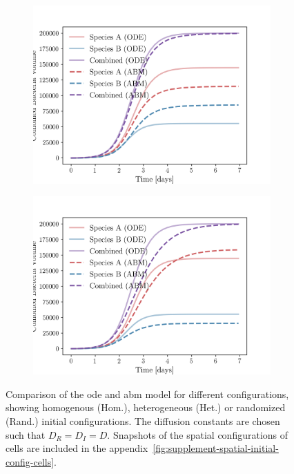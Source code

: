 \documentclass[10pt,twocolumn,5p]{elsarticle}
\numberwithin{equation}{section}
\begin{document}
\begin{figure}
\begin{subfigure}[c]{0.5\columnwidth}
    \end{subfigure}\\
    \begin{subfigure}[c]{0.5\columnwidth}
        \includegraphics[width=\columnwidth]{Figures-abm-inhomogenous-abm_ode_comparison.png}%
    \end{subfigure}%
    \begin{subfigure}[c]{0.5\columnwidth}
        \includegraphics[width=\columnwidth]{Figures-abm-random-abm_ode_comparison.png}%
    \end{subfigure}
    \caption{
        Comparison of the \ac{ode} and \ac{abm} model for different configurations, showing
        homogenous (Hom.), heterogeneous (Het.) or randomized (Rand.) initial configurations.
        The diffusion constants are chosen such that $D_R=D_I=D$.
        Snapshots of the spatial configurations of cells are included in the appendix~\ref{fig:supplement-spatial-initial-config-cells}.
    }
    \label{fig:spatial-growth-curve}
\end{figure}
\end{document}
